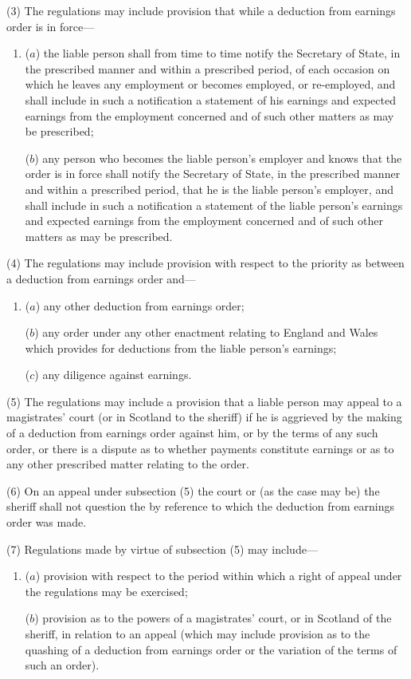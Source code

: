 \documentclass[a4paper]{article}
\begin{document}
(3) The regulations may include provision that while a deduction from earnings order is in force---
\begin{enumerate}\item[]
($a$) the liable person shall from time to time notify the Secretary of State, in the prescribed manner and within a prescribed period, of each occasion on which he leaves any employment or becomes employed, or re-employed, and shall include in such a notification a statement of his earnings and expected earnings from the employment concerned and of such other matters as may be prescribed;

($b$) any person who becomes the liable person’s employer and knows that the order is in force shall notify the Secretary of State, in the prescribed manner and within a prescribed period, that he is the liable person’s employer, and shall include in such a notification a statement of the liable person’s earnings and expected earnings from the employment concerned and of such other matters as may be prescribed.
\end{enumerate}

(4) The regulations may include provision with respect to the priority as between a deduction from earnings order and---
\begin{enumerate}\item[]
($a$) any other deduction from earnings order;

($b$) any order under any other enactment relating to England and Wales which provides for deductions from the liable person’s earnings;

($c$) any diligence against earnings.
\end{enumerate}

(5) The regulations may include a provision that a liable person may appeal to a magistrates’ court (or in Scotland to the sheriff) if he is aggrieved by the making of a deduction from earnings order against him, or by the terms of any such order,
or there is a dispute as to whether payments constitute earnings or as to any other prescribed matter relating to the order.

(6) On an appeal under subsection (5) the court or (as the case may be) the sheriff shall not question the  by reference to which the deduction from earnings order was made.

(7) Regulations made by virtue of subsection (5) may include---
\begin{enumerate}\item[]
($a$) provision with respect to the period within which a right of appeal under the
regulations may be exercised;

($b$) provision as to the powers of a magistrates’ court, or in Scotland of the
sheriff, in relation to an appeal (which may include provision as to the
quashing of a deduction from earnings order or the variation of the terms of
such an order).
\end{enumerate}
\end{document}
